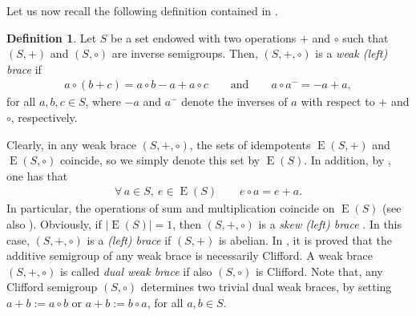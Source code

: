 \documentclass[preprint,1p]{elsarticle}
\theoremstyle{definition}               %
\newtheorem{defin}[theor]{Definition}
\DeclareMathOperator{\E}{E}
\begin{document}

\medskip

Let us now recall the following definition contained in \cite[Definition 5]{CaMaMiSt22}.
\begin{defin} 
    Let $S$ be a set endowed with two operations $+$ and $\circ$ such that $\left(S,+\right)$ and $\left(S,\circ\right)$ are inverse semigroups. Then, $(S, +, \circ)$ is a \emph{ weak (left) brace} if
 \begin{align*}
    a\circ\left(b + c\right)
    = a\circ b -a+ a\circ c\qquad \text{and}\qquad a\circ a^-=-a+a,
 \end{align*}
for all $a,b,c\in S$, where $-a$ and $a^-$ denote the inverses of $a$ with respect to $+$ and $\circ$, respectively.  
\end{defin}

Clearly, in any weak brace $(S,+,\circ )$, the sets of idempotents $\E(S,+)$ and $\E(S,\circ)$ coincide, so we simply denote this set by $\E(S)$. 
In addition, by \cite[Lemma 1.4]{CaMaSt24}, one has that 
\begin{align}\label{eq:idem+circ}
   \forall\, a\in S, \ e \in \E(S) \qquad  e \circ a=e+a.
\end{align}
In particular, the operations of sum and multiplication coincide on $\E(S)$ (see also \cite{CaMaSt23}). Obviously, if $|\E(S)|=1$, then $(S,+, \circ)$ is a \emph{skew (left) brace} \cite{GuVe17}. In this case, $(S,+, \circ)$ is a \emph{(left) brace} if $(S, +)$ is abelian.
In \cite[Theorem 8]{CaMaMiSt22}, it is proved that the additive semigroup of any weak brace is necessarily Clifford. A weak brace $(S, +, \circ)$ is called \emph{dual weak brace} if also $(S, \circ)$ is Clifford. Note that, any Clifford semigroup $\left(S, \circ\right)$ determines two trivial dual weak braces, by setting $a + b:= a\circ b$ or $a + b:= b\circ a$, for all $a, b\in S$.

\end{document}
